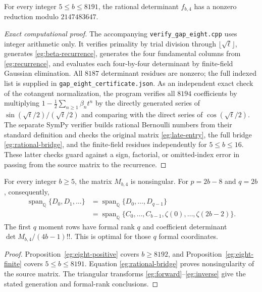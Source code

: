 \begin{proposition}
\label{eg:eight-finite}
For every integer $5\le b\le8191$, the rational determinant
$f_{b,4}$ has a nonzero reduction modulo $2147483647$.
\end{proposition}

\begin{proof}[Exact computational proof]
The accompanying \texttt{verify\_gap\_eight.cpp} uses integer
arithmetic only.  It verifies primality by trial division through
$\lfloor\sqrt\ell\rfloor$, generates \eqref{eg:beta-recurrence},
generates the four fundamental columns from \eqref{eg:recurrence},
and evaluates each four-by-four determinant by finite-field Gaussian
elimination.  All $8187$ determinant residues are nonzero; the full
indexed list is supplied in \texttt{gap\_eight\_certificate.json}.
As an independent exact check of the cotangent normalization, the
program verifies all $8194$ coefficients by multiplying
$1-\tfrac12\sum_{n\ge1}\beta_nt^n$ by the directly generated
series of $\sin(\sqrt t/2)/(\sqrt t/2)$ and comparing with the
direct series of $\cos(\sqrt t/2)$.
The separate SymPy verifier builds rational Bernoulli numbers from
their standard definition and checks the original matrix
\eqref{eg:late-entry}, the full bridge \eqref{eg:rational-bridge},
and the finite-field residues independently for $5\le b\le16$.
These latter checks guard against a sign, factorial, or omitted-index
error in passing from the source matrix to the recurrence.
\end{proof}

\begin{theorem}
\label{eg:eight-main}
For every integer $b\ge5$, the matrix $M_{b,4}$ is nonsingular.
For $p=2b-8$ and $q=2b$, consequently,
\begin{align*}
 \operatorname{span}_{\mathbb Q}\{D_0,D_1,\ldots\}
 &=\operatorname{span}_{\mathbb Q}\{D_0,\ldots,D_{q-1}\}\\
 &=\operatorname{span}_{\mathbb Q}
       \{C_0,\ldots,C_{b-1},\zeta(0),\ldots,\zeta(2b-2)\}.
\end{align*}
The first $q$ moment rows have formal rank $q$ and coefficient
determinant $\det M_{b,4}/(4b-1)!!$.  This is optimal for those
$q$ formal coordinates.
\end{theorem}

\begin{proof}
Proposition~\ref{eg:eight-positive} covers $b\ge8192$, and
Proposition~\ref{eg:eight-finite} covers $5\le b\le8191$.
Equation \eqref{eg:rational-bridge} proves nonsingularity of the
source matrix.  The triangular transforms
\eqref{eg:forward}--\eqref{eg:inverse} give the stated generation
and formal-rank conclusions.
\end{proof}

